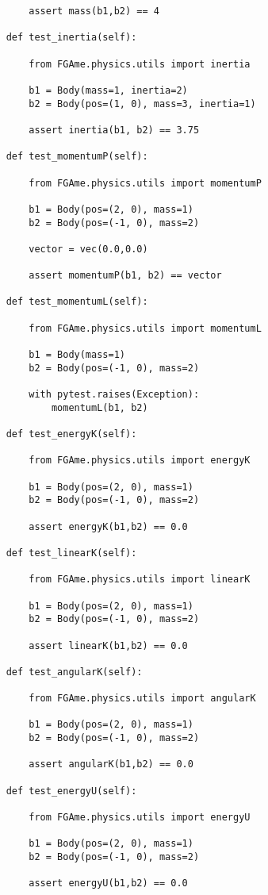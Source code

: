 \begin{anexosenv}
\begin{lstlisting}
        assert mass(b1,b2) == 4

    def test_inertia(self):

        from FGAme.physics.utils import inertia

        b1 = Body(mass=1, inertia=2)
        b2 = Body(pos=(1, 0), mass=3, inertia=1)

        assert inertia(b1, b2) == 3.75

    def test_momentumP(self):

        from FGAme.physics.utils import momentumP

        b1 = Body(pos=(2, 0), mass=1)
        b2 = Body(pos=(-1, 0), mass=2)

        vector = vec(0.0,0.0)

        assert momentumP(b1, b2) == vector

    def test_momentumL(self):

        from FGAme.physics.utils import momentumL

        b1 = Body(mass=1)
        b2 = Body(pos=(-1, 0), mass=2)

        with pytest.raises(Exception):
            momentumL(b1, b2)

    def test_energyK(self):

        from FGAme.physics.utils import energyK

        b1 = Body(pos=(2, 0), mass=1)
        b2 = Body(pos=(-1, 0), mass=2)

        assert energyK(b1,b2) == 0.0

    def test_linearK(self):

        from FGAme.physics.utils import linearK

        b1 = Body(pos=(2, 0), mass=1)
        b2 = Body(pos=(-1, 0), mass=2)

        assert linearK(b1,b2) == 0.0

    def test_angularK(self):

        from FGAme.physics.utils import angularK

        b1 = Body(pos=(2, 0), mass=1)
        b2 = Body(pos=(-1, 0), mass=2)

        assert angularK(b1,b2) == 0.0

    def test_energyU(self):

        from FGAme.physics.utils import energyU

        b1 = Body(pos=(2, 0), mass=1)
        b2 = Body(pos=(-1, 0), mass=2)

        assert energyU(b1,b2) == 0.0


\end{lstlisting}
\end{anexosenv}
